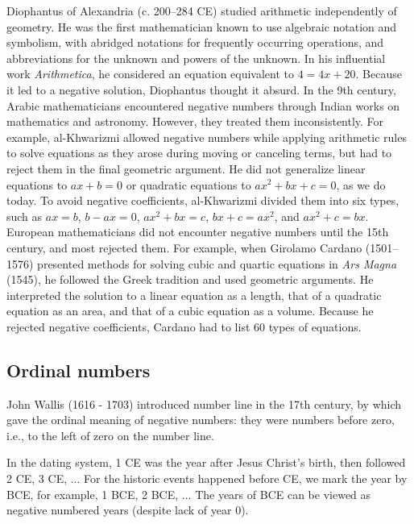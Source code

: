 \documentclass[b5paper]{article}
\begin{document}
Diophantus of Alexandria (c. 200--284 CE) studied arithmetic independently of geometry. He was the first mathematician known to use algebraic notation and symbolism, with abridged notations for frequently occurring operations, and abbreviations for the unknown and powers of the unknown. In his influential work {\em Arithmetica}, he considered an equation equivalent to $4 = 4x + 20$. Because it led to a negative solution, Diophantus thought it absurd. In the 9th century, Arabic mathematicians encountered negative numbers through Indian works on mathematics and astronomy. However, they treated them inconsistently. For example, al-Khwarizmi allowed negative numbers while applying arithmetic rules to solve equations as they arose during moving or canceling terms, but had to reject them in the final geometric argument. He did not generalize linear equations to $ax + b = 0$ or quadratic equations to $ax^2 + bx + c = 0$, as we do today. To avoid negative coefficients, al-Khwarizmi divided them into six types, such as $ax = b$, $b - ax = 0$, $ax^2 + bx = c$, $bx + c = ax^2$, and $ax^2 + c = bx$. European mathematicians did not encounter negative numbers until the 15th century, and most rejected them. For example, when Girolamo Cardano (1501--1576) presented methods for solving cubic and quartic equations in {\em Ars Magna} (1545), he followed the Greek tradition and used geometric arguments. He interpreted the solution to a linear equation as a length, that of a quadratic equation as an area, and that of a cubic equation as a volume. Because he rejected negative coefficients, Cardano had to list 60 types of equations.

\subsection{Ordinal numbers}
 
John Wallis (1616 - 1703) introduced number line in the 17th century, by which gave the ordinal meaning of negative numbers: they were numbers before zero, i.e., to the left of zero on the number line.

\begin{example}
In the dating system, 1 CE was the year after Jesus Christ's birth, then followed 2 CE, 3 CE, ... For the historic events happened before CE, we mark the year by BCE, for example, 1 BCE, 2 BCE, ... The years of BCE can be viewed as negative numbered years (despite lack of year 0).
\end{example}
\end{document}
